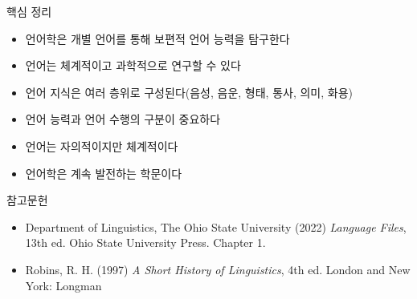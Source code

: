 \documentclass[11pt, aspectratio=169]{beamer}
\newcommand{\texttnr}[1]{{\tnrfont #1}}
\begin{document}
\begin{frame}[t]{핵심 정리}
\begin{itemize}
\item 언어학은 개별 언어를 통해 보편적 언어 능력을 탐구한다
\item 언어는 체계적이고 과학적으로 연구할 수 있다
\item 언어 지식은 여러 층위로 구성된다(음성, 음운, 형태, 통사, 의미, 화용)
\item 언어 능력과 언어 수행의 구분이 중요하다
\item 언어는 자의적이지만 체계적이다
\item 언어학은 계속 발전하는 학문이다
\end{itemize}
\end{frame}

\begin{frame}[t]{참고문헌}
  \begin{itemize}
    \item \texttnr{Department of Linguistics, The Ohio State University (2022) \textit{Language Files}, 13th ed. Ohio State University Press. Chapter 1.}
    \item \texttnr{Robins, R. H. (1997) \textit{A Short History of Linguistics}, 4th ed. London and New York: Longman}
  \end{itemize}
\end{frame}
\end{document}
